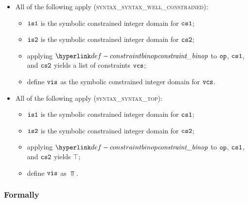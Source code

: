 \begin{itemize}
  \item All of the following apply (\textsc{syntax\_syntax\_well\_constrained}):
  \begin{itemize}
    \item $\visone$ is the symbolic constrained integer domain for $\csone$;
    \item $\vistwo$ is the symbolic constrained integer domain for $\cstwo$;
    \item applying $\constraintbinop$ to $\op$, $\csone$, and $\cstwo$ yields
          a list of constraints $\vcs$;
    \item define $\vis$ as the symbolic constrained integer domain for $\vcs$.
  \end{itemize}

  \item All of the following apply (\textsc{syntax\_syntax\_top}):
  \begin{itemize}
    \item $\visone$ is the symbolic constrained integer domain for $\csone$;
    \item $\vistwo$ is the symbolic constrained integer domain for $\cstwo$;
    \item applying $\constraintbinop$ to $\op$, $\csone$, and $\cstwo$ yields $\top$;
    \item define $\vis$ as $\Top$.
  \end{itemize}
\end{itemize}

\subsubsection{Formally}

\begin{mathpar}
\end{mathpar}

